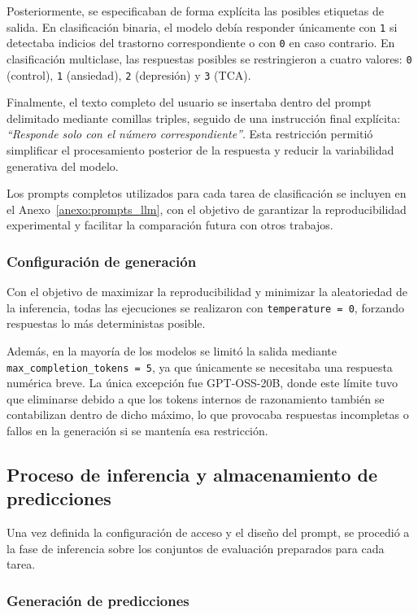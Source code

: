 Posteriormente, se especificaban de forma explícita las posibles etiquetas de salida. En clasificación binaria, el modelo debía responder únicamente con \texttt{1} si detectaba indicios del trastorno correspondiente o con \texttt{0} en caso contrario. En clasificación multiclase, las respuestas posibles se restringieron a cuatro valores: \texttt{0} (control), \texttt{1} (ansiedad), \texttt{2} (depresión) y \texttt{3} (\ac{TCA}).

Finalmente, el texto completo del usuario se insertaba dentro del prompt delimitado mediante comillas triples, seguido de una instrucción final explícita: \textit{``Responde solo con el número correspondiente''}. Esta restricción permitió simplificar el procesamiento posterior de la respuesta y reducir la variabilidad generativa del modelo.

Los prompts completos utilizados para cada tarea de clasificación se incluyen en el Anexo~\ref{anexo:prompts_llm}, con el objetivo de garantizar la reproducibilidad experimental y facilitar la comparación futura con otros trabajos.

\subsubsection{Configuración de generación}

Con el objetivo de maximizar la reproducibilidad y minimizar la aleatoriedad de la inferencia, todas las ejecuciones se realizaron con \texttt{temperature = 0}, forzando respuestas lo más deterministas posible.

Además, en la mayoría de los modelos se limitó la salida mediante \texttt{max\_completion\_tokens = 5}, ya que únicamente se necesitaba una respuesta numérica breve. La única excepción fue GPT-OSS-20B, donde este límite tuvo que eliminarse debido a que los tokens internos de razonamiento también se contabilizan dentro de dicho máximo, lo que provocaba respuestas incompletas o fallos en la generación si se mantenía esa restricción.

\subsection{Proceso de inferencia y almacenamiento de predicciones}

Una vez definida la configuración de acceso y el diseño del prompt, se procedió a la fase de inferencia sobre los conjuntos de evaluación preparados para cada tarea.

\subsubsection{Generación de predicciones}

